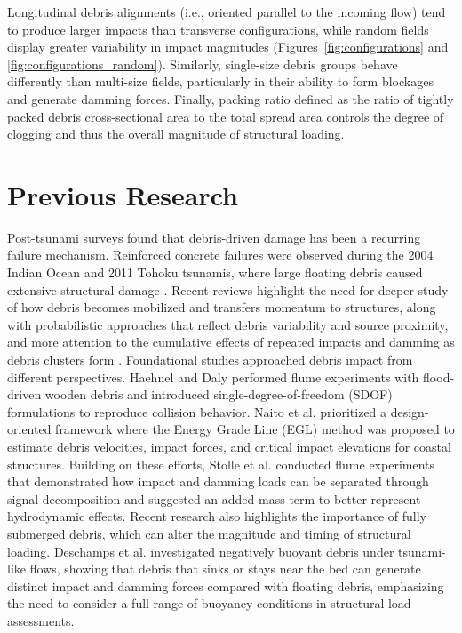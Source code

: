 \documentclass{article}
\begin{document}
Longitudinal debris alignments (i.e., oriented parallel to the incoming flow) tend to produce larger impacts than transverse configurations, while random fields display greater variability in impact magnitudes (Figures~\ref{fig:configurations} and \ref{fig:configurations_random}). Similarly, single-size debris groups behave differently than multi-size fields, particularly in their ability to form blockages and generate damming forces. Finally, packing ratio defined as the ratio of tightly packed debris cross-sectional area to the total spread area controls the degree of clogging and thus the overall magnitude of structural loading.

\section{Previous Research} Post-tsunami surveys found that debris-driven damage has been a recurring failure mechanism. Reinforced concrete failures were observed during the 2004 Indian Ocean and 2011 Tohoku tsunamis, where large floating debris caused extensive structural damage \citep{Leonard2011,Akiyama2013}. Recent reviews highlight the need for deeper study of how debris becomes mobilized and transfers momentum to structures, along with probabilistic approaches that reflect debris variability and source proximity, and more attention to the cumulative effects of repeated impacts and damming as debris clusters form \citep{nistorTsunamiDrivenDebrisMotion2017}.
Foundational studies approached debris impact from different perspectives. Haehnel and Daly \citep{Haehnel2004} performed flume experiments with flood-driven wooden debris and introduced single-degree-of-freedom (SDOF) formulations to reproduce collision behavior. Naito et al. \citep{Naito2016} prioritized a design-oriented framework where the Energy Grade Line (EGL) method was proposed to estimate debris velocities, impact forces, and critical impact elevations for coastal structures. Building on these efforts, Stolle et al. \citep{Stolle2018,Stolle2019} conducted flume experiments that demonstrated how impact and damming loads can be separated through signal decomposition and suggested an added mass term to better represent hydrodynamic effects. Recent research also highlights the importance of  fully submerged debris, which can alter the magnitude and timing of structural loading. Deschamps et al. \citep{deschampsNegativelyBuoyantDebris2025} investigated negatively buoyant debris under tsunami-like flows, showing that debris that sinks or stays near the bed can generate distinct impact and damming forces compared with floating debris, emphasizing the need to consider a full range of buoyancy conditions in structural load assessments.
\end{document}
